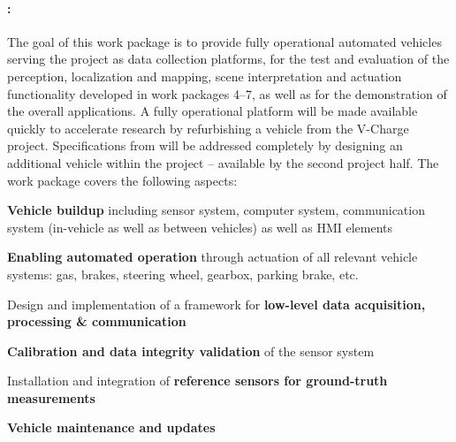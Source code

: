 \paragraph{\textbf{\WPVehicle: \WPVehicleTitle}}
The goal of this work package is to provide fully operational automated vehicles serving the project as data collection platforms, for the test and evaluation of the  perception, localization and mapping, scene interpretation and actuation functionality developed in work packages 4--7, as well as for the demonstration of the overall applications. A fully operational platform will be made available quickly to accelerate research by refurbishing a vehicle from the V-Charge project. Specifications from \WPSpecification will be addressed completely by designing an additional vehicle within the \Project{} project -- available by the second project half. The work package covers the following aspects:
\begin{denseItemize}
\item \textbf{Vehicle buildup} including sensor system, computer system, communication system (in-vehicle as well as between vehicles) as well as HMI elements
\item \textbf{Enabling automated operation} through actuation of all relevant vehicle systems: gas, brakes, steering wheel, gearbox, parking brake, etc.
\item Design and implementation of a framework for \textbf{low-level data acquisition, processing \& communication}
\item\textbf{Calibration and data integrity validation} of the sensor system
\item Installation and integration of \textbf{reference sensors for ground-truth measurements}
\item \textbf{Vehicle maintenance and updates}
\end{denseItemize}


